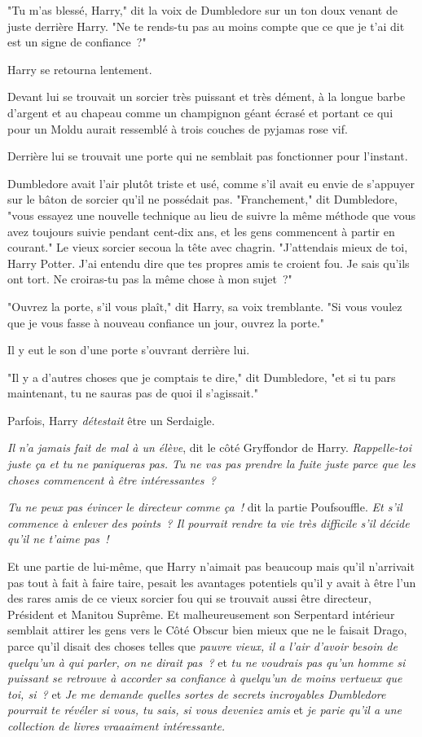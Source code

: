 "Tu m'as blessé, Harry," dit la voix de Dumbledore sur un ton doux venant de juste derrière Harry. "Ne te rends-tu pas au moins compte que ce que je t'ai dit est un signe de confiance~?"

Harry se retourna lentement.

Devant lui se trouvait un sorcier très puissant et très dément, à la longue barbe d'argent et au chapeau comme un champignon géant écrasé et portant ce qui pour un Moldu aurait ressemblé à trois couches de pyjamas rose vif.

Derrière lui se trouvait une porte qui ne semblait pas fonctionner pour l'instant.

Dumbledore avait l'air plutôt triste et usé, comme s'il avait eu envie de s'appuyer sur le bâton de sorcier qu'il ne possédait pas. "Franchement," dit Dumbledore, "vous essayez une nouvelle technique au lieu de suivre la même méthode que vous avez toujours suivie pendant cent-dix ans, et les gens commencent à partir en courant." Le vieux sorcier secoua la tête avec chagrin. "J'attendais mieux de toi, Harry Potter. J'ai entendu dire que tes propres amis te croient fou. Je sais qu'ils ont tort. Ne croiras-tu pas la même chose à mon sujet~?"

"Ouvrez la porte, s'il vous plaît," dit Harry, sa voix tremblante. "Si vous voulez que je vous fasse à nouveau confiance un jour, ouvrez la porte."

Il y eut le son d'une porte s'ouvrant derrière lui.

"Il y a d'autres choses que je comptais te dire," dit Dumbledore, "et si tu pars maintenant, tu ne sauras pas de quoi il s'agissait."

Parfois, Harry \emph{détestait} être un Serdaigle.

\emph{Il n'a jamais fait de mal à un élève}, dit le côté Gryffondor de Harry. \emph{Rappelle-toi juste ça et tu ne paniqueras pas. Tu ne vas pas prendre la fuite juste parce que les choses commencent à être intéressantes~?}

\emph{Tu ne peux pas évincer le directeur comme ça~!} dit la partie Poufsouffle. \emph{Et s'il commence à enlever des points~? Il pourrait rendre ta vie très difficile s'il décide qu'il ne t'aime pas~!}

Et une partie de lui-même, que Harry n'aimait pas beaucoup mais qu'il n'arrivait pas tout à fait à faire taire, pesait les avantages potentiels qu'il y avait à être l'un des rares amis de ce vieux sorcier fou qui se trouvait aussi être directeur, Président et Manitou Suprême. Et malheureusement son Serpentard intérieur semblait attirer les gens vers le Côté Obscur bien mieux que ne le faisait Drago, parce qu'il disait des choses telles que \emph{pauvre vieux, il a l'air d'avoir besoin de quelqu'un à qui parler, on ne dirait pas~?} et \emph{tu ne voudrais pas qu'un homme si puissant se retrouve à accorder sa confiance à quelqu'un de moins vertueux que toi, si~?} et \emph{Je me demande quelles sortes de secrets incroyables Dumbledore pourrait te révéler si vous, tu sais, si vous deveniez amis} et \emph{je parie qu'il a une collection de livres vraaaiment intéressante.}

